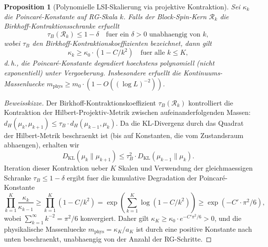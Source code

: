 \documentclass[12pt,a4paper]{article}
\theoremstyle{definition}
\theoremstyle{plain}
\newtheorem{proposition}[definition]{Proposition}
\theoremstyle{remark}
\begin{document}
\begin{proposition}[Polynomielle LSI-Skalierung via projektive Kontraktion]
\label{prop:polynomial-lsi}
Sei $\kappa_k$ die Poincar\'e-Konstante auf RG-Skala $k$. Falls der Block-Spin-Kern $\mathcal{R}_k$ die Birkhoff-Kontraktionsschranke erfuellt
\[
\tau_B(\mathcal{R}_k) \leq 1 - \delta \quad \text{fuer ein } \delta > 0 \text{ unabhaengig von } k,
\]
wobei $\tau_B$ den Birkhoff-Kontraktionskoeffizienten bezeichnet, dann gilt
\[
\kappa_k \geq \kappa_0 \cdot (1 - C/k^2) \quad \text{fuer alle } k \leq K,
\]
d.\,h., die Poincar\'e-Konstante degradiert hoechstens polynomiell (nicht exponentiell) unter Vergoeberung. Insbesondere erfuellt die Kontinuums-Massenluecke $m_{\mathrm{phys}} \geq m_0 \cdot (1 - O((\log L)^{-2}))$.
\end{proposition}

\begin{proof}[Beweisskizze]
Der Birkhoff-Kontraktionskoeffizient $\tau_B(\mathcal{R}_k)$ kontrolliert die Kontraktion der Hilbert-Projektiv-Metrik zwischen aufeinanderfolgenden Massen: $d_H(\mu_k, \mu_{k+1}) \leq \tau_B \cdot d_H(\mu_{k-1}, \mu_k)$. Da die KL-Divergenz durch das Quadrat der Hilbert-Metrik beschraenkt ist (bis auf Konstanten, die vom Zustandsraum abhaengen), erhalten wir
\[
D_{\mathrm{KL}}(\mu_k \| \mu_{k+1}) \leq \tau_B^2 \cdot D_{\mathrm{KL}}(\mu_{k-1} \| \mu_k).
\]
Iteration dieser Kontraktion ueber $K$ Skalen und Verwendung der gleichmaessigen Schranke $\tau_B \leq 1 - \delta$ ergibt fuer die kumulative Degradation der Poincar\'e-Konstante
\[
\prod_{k=1}^{K} \frac{\kappa_k}{\kappa_{k-1}} \geq \prod_{k=1}^{K} (1 - C/k^2) = \exp\!\left(\sum_{k=1}^{K} \log(1 - C/k^2)\right) \geq \exp(-C' \cdot \pi^2/6),
\]
wobei $\sum_{k=1}^{\infty} k^{-2} = \pi^2/6$ konvergiert. Daher gilt $\kappa_K \geq \kappa_0 \cdot e^{-C'\pi^2/6} > 0$, und die physikalische Massenluecke $m_{\mathrm{phys}} = \kappa_K / a_K$ ist durch eine positive Konstante nach unten beschraenkt, unabhaengig von der Anzahl der RG-Schritte.
\end{proof}
\end{document}
